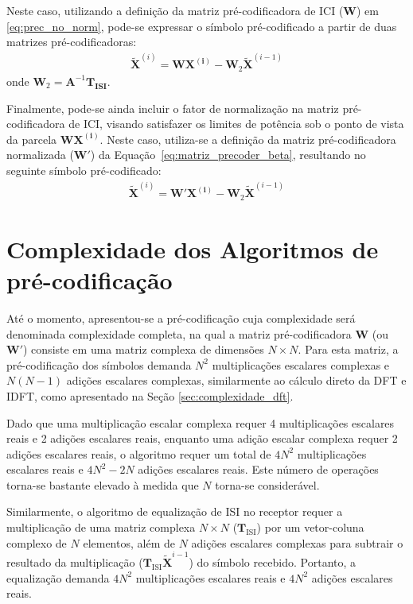 Neste caso, utilizando a definição da matriz pré-codificadora de ICI ($\mathbf{W}$) em
\ref{eq:prec_no_norm}, pode-se expressar o símbolo pré-codificado a partir de duas matrizes pré-codificadoras:
\begin{align}
\mathbf{\tilde{X}}^{(i)} = \mathbf{W} \mathbf{X^{(i)}} - \mathbf{W}_2 \mathbf{\tilde{X}}^{(i-1)} 
\end{align}
onde $\mathbf{W}_2 = \mathbf{A}^{-1}\mathbf{ T_\text{ISI}}$.

Finalmente, pode-se ainda incluir o fator de normalização na matriz pré-codificadora de ICI, visando satisfazer os limites de potência sob o ponto de vista da parcela $\mathbf{W} \mathbf{X^{(i)}}$. Neste caso, utiliza-se a definição da matriz pré-codificadora normalizada ($\mathbf{W}'$) da Equação~\ref{eq:matriz_precoder_beta}, resultando no seguinte símbolo pré-codificado:
\begin{align}
\mathbf{\tilde{X}}^{(i)} = \mathbf{W}' \mathbf{X^{(i)}} - \mathbf{W}_2 \mathbf{\tilde{X}}^{(i-1)} 
\label{eq:precoder_ici_isi}
\end{align}

\section{Complexidade dos Algoritmos de pré-codificação}
\label{sec:complexidade_precodificacao}

Até o momento, apresentou-se a pré-codificação cuja complexidade será denominada complexidade completa, na qual a matriz pré-codificadora $\mathbf{W}$ (ou $\mathbf{W}'$)  consiste em uma matriz complexa de dimensões $N \times N$. Para esta matriz, a pré-codificação dos símbolos demanda $N^2$ multiplicações escalares complexas e $N(N-1)$ adições escalares complexas, similarmente ao cálculo direto da DFT e IDFT, como apresentado na Seção \ref{sec:complexidade_dft}.

Dado que uma multiplicação escalar complexa requer 4 multiplicações escalares reais e 2 adições escalares reais, enquanto uma adição escalar complexa requer 2 adições escalares reais, o algoritmo requer um total de $4N^2$ multiplicações escalares reais e  $4N^2 - 2N$ adições escalares reais. Este número de operações torna-se bastante elevado à medida que $N$ torna-se considerável. 

Similarmente, o algoritmo de equalização de ISI no receptor requer a multiplicação de uma matriz complexa $N \times N$ ($\mathbf{T}_\text{ISI}$) por um vetor-coluna complexo de $N$ elementos, além de $N$ adições escalares complexas para subtrair o resultado da multiplicação ($\mathbf{T}_\text{ISI} \mathbf{\tilde{X}}^{i-1}$) do símbolo recebido. Portanto, a equalização demanda $4N^2$ multiplicações escalares reais e $4N^2$ adições escalares reais.  

